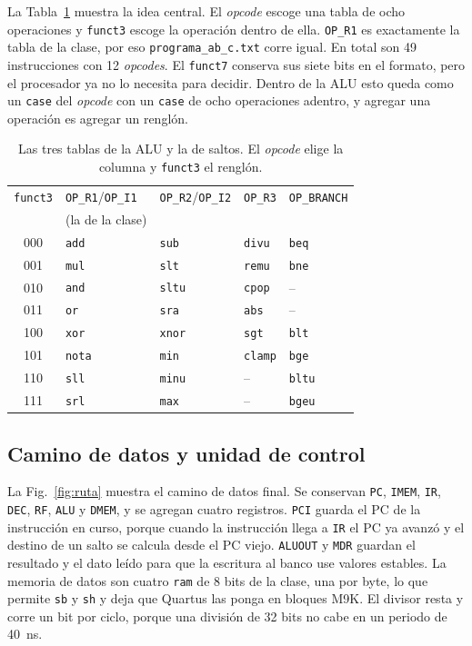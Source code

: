 \documentclass[conference,letterpaper,10pt]{IEEEtran}
\newcommand{\sig}[1]{{\small\texttt{#1}}}
\newcommand{\tabfont}{\footnotesize}
\begin{document}
La Tabla~\ref{tab:isa} muestra la idea central. El \emph{opcode} escoge una tabla de ocho operaciones y \sig{funct3} escoge la
operación dentro de ella. \sig{OP\_R1} es exactamente la tabla de la clase, por eso \sig{programa\_ab\_c.txt} corre igual. En total
son 49 instrucciones con 12 \emph{opcodes}. El \sig{funct7} conserva sus siete bits en el formato, pero el procesador ya no lo
necesita para decidir. Dentro de la ALU esto queda como un \sig{case} del \emph{opcode} con un \sig{case} de ocho operaciones
adentro, y agregar una operación es agregar un renglón.

\begin{table}[!t]
\centering
\caption{Las tres tablas de la ALU y la de saltos. El \emph{opcode} elige la columna y \sig{funct3} el renglón.}
\label{tab:isa}
\tabfont
\setlength{\tabcolsep}{4.2pt}
\begin{tabular}{@{}cllll@{}}
\toprule
\sig{funct3} & \sig{OP\_R1}/\sig{OP\_I1} & \sig{OP\_R2}/\sig{OP\_I2} & \sig{OP\_R3} & \sig{OP\_BRANCH} \\
 & (la de la clase) & & & \\
\midrule
000 & \sig{add} & \sig{sub}  & \sig{divu}  & \sig{beq} \\
001 & \sig{mul} & \sig{slt}  & \sig{remu}  & \sig{bne} \\
010 & \sig{and} & \sig{sltu} & \sig{cpop}  & -- \\
011 & \sig{or}  & \sig{sra}  & \sig{abs}   & -- \\
100 & \sig{xor} & \sig{xnor} & \sig{sgt}   & \sig{blt} \\
101 & \sig{nota}& \sig{min}  & \sig{clamp} & \sig{bge} \\
110 & \sig{sll} & \sig{minu} & --          & \sig{bltu} \\
111 & \sig{srl} & \sig{max}  & --          & \sig{bgeu} \\
\bottomrule
\end{tabular}
\end{table}

\subsection{Camino de datos y unidad de control}

La Fig.~\ref{fig:ruta} muestra el camino de datos final. Se conservan \sig{PC}, \sig{IMEM}, \sig{IR}, \sig{DEC}, \sig{RF},
\sig{ALU} y \sig{DMEM}, y se agregan cuatro registros. \sig{PCI} guarda el PC de la instrucción en curso, porque cuando la
instrucción llega a \sig{IR} el PC ya avanzó y el destino de un salto se calcula desde el PC viejo. \sig{ALUOUT} y \sig{MDR}
guardan el resultado y el dato leído para que la escritura al banco use valores estables. La memoria de datos son cuatro
\sig{ram} de 8 bits de la clase, una por byte, lo que permite \sig{sb} y \sig{sh} y deja que Quartus las ponga en bloques M9K. El
divisor resta y corre un bit por ciclo, porque una división de 32 bits no cabe en un periodo de 40~ns.
\end{document}
